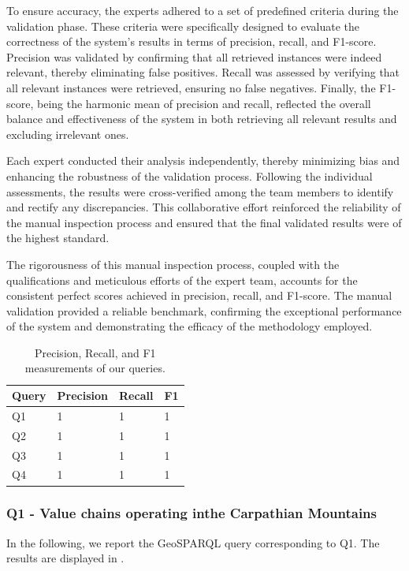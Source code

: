 To ensure accuracy, the experts adhered to a set of predefined criteria during the validation phase. These criteria were specifically designed to evaluate the correctness of the system's results in terms of precision, recall, and F1-score. Precision was validated by confirming that all retrieved instances were indeed relevant, thereby eliminating false positives. Recall was assessed by verifying that all relevant instances were retrieved, ensuring no false negatives. Finally, the F1-score, being the harmonic mean of precision and recall, reflected the overall balance and effectiveness of the system in both retrieving all relevant results and excluding irrelevant ones.

Each expert conducted their analysis independently, thereby minimizing bias and enhancing the robustness of the validation process. Following the individual assessments, the results were cross-verified among the team members to identify and rectify any discrepancies. This collaborative effort reinforced the reliability of the manual inspection process and ensured that the final validated results were of the highest standard.

The rigorousness of this manual inspection process, coupled with the qualifications and meticulous efforts of the expert team, accounts for the consistent perfect scores achieved in precision, recall, and F1-score. The manual validation provided a reliable benchmark, confirming the exceptional performance of the system and demonstrating the efficacy of the methodology employed.

\begin{table}[H]
    \centering
        \caption{Precision, Recall, and F1 measurements of our queries.}
    \label{tab:evaluationQueries}
    \begin{tabular}{|l|l|l|l|}
    \hline
 Query & Precision & Recall & F1\\
\hline
        Q1 & 1 & 1 & 1\\ \hline
        Q2 & 1 & 1 & 1\\ \hline
        Q3 & 1 & 1 & 1 \\  \hline
        Q4 & 1 & 1 & 1 \\ \hline
    \end{tabular}
\end{table}

\subsubsection*{Q1 - Value chains operating inthe Carpathian Mountains}
In the following, we report the GeoSPARQL query corresponding to Q1. The results are displayed in .

